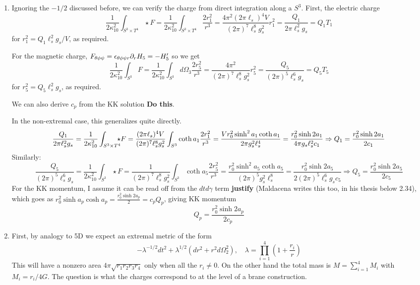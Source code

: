 \documentclass[11pt, class=article, crop=false]{standalone}
\begin{document}
\begin{enumerate}
	Finally, the D1 solution can be given momentum. 
	
	\item 
	Ignoring the $-1/2$ discussed before, we can verify the charge from direct integration along a $S^3$. First, the electric charge 
	\[
		\frac{1}{2 \kappa_{10}^2} \int_{S^3 \times T^4} \star F = \frac{1}{2 \kappa_{10}^2} \int_{S^3 \times T^4} \frac{2 r_1^2}{r^3} = \frac{4\pi^2 (2\pi \ell_s)^4 V}{(2\pi)^7 \ell_s^8 g_s^2} r_1^2 = \frac{Q_1}{2\pi \ell_s^2 g_s} = Q_1 T_1
	\]
	for $r_1^2 = Q_1 \ell_s^2 g_s/V$, as required.
	
	For the magnetic charge, $F_{\theta \phi \psi} = \epsilon_{\theta \phi \psi r} \partial_r H_5 = -H_5'$ so we get
	\[
		\frac{1}{2 \kappa_{10}^2} \int_{S^3} F = \frac{1}{2 \kappa_{10}^2} \int_{S^3} d\Omega_3 \frac{2 r_5^2}{r^3} = \frac{4 \pi^2}{(2\pi)^7 \ell_s^8 g_s^2} r_5^2 = \frac{Q_5}{(2\pi)^5 \ell_s^6 g_s} = Q_5 T_5
	\]
	for $r_5^2= Q_5 \ell_s^2 g_s$, as required.
	
	We can also derive $c_p$ from the KK solution \textbf{Do this}.
	
	In the non-extremal case, this generalizes quite directly. 
	\[
		\frac{Q_1}{2 \pi \ell_s^2 g_s} = \frac{1}{2\kappa_{10}^2} \int_{S^3 \times T^4}  \hspace{-.1in}\star F = \frac{(2 \pi \ell_s)^4 V}{(2\pi)^7 \ell_s^8 g_s^2} \int_{S^3} \coth a_1 \frac{2 r_1^2}{r^3} = \frac{V r_0^2 \sinh^2 a_1 \coth a_1}{2\pi g_s^2 \ell_s^4} = \frac{r_0^2 \sinh 2a_1 }{4\pi g_s \ell_s^2 c_1} \Rightarrow Q_1 = \frac{r_0^2 \sinh 2 a_1}{2 c_1}
	\]
	Similarly: 
	\[
		\frac{Q_5}{(2 \pi)^5 \ell_s^6 g_s} = \frac{1}{2\kappa_{10}^2} \int_{S^3}  \star F = \frac{1}{(2\pi)^7 \ell_s^8 g_s^2} \int_{S^3} \coth a_5 \frac{2 r_5^2}{r^3} = \frac{r_0^2 \sinh^2 a_5 \coth a_5}{(2 \pi)^5 g_s^2 \ell_s^8} = \frac{r_0^2 \sinh 2a_5}{2 (2 \pi)^5 \ell_s^6 g_s c_5} \Rightarrow Q_5 = \frac{r_0^2 \sinh 2 a_5}{2 c_5}
	\]
	For the KK momentum, I assume it can be read off from the $dt d\gamma$ term \textbf{justify} (Maldacena writes this too, in his thesis below 2.34), which goes as $r_0^2 \sinh a_p \cosh a_p = \frac{r_0^2 \sinh 2a_p}{2} = c_p Q_p$, giving KK momentum
	\[
		Q_p = \frac{r_0^2 \sinh 2a_p}{2 c_p}
	\]
	
	\item 
	First, by analogy to 5D we expect an extremal metric of the form
	\[
		- \lambda^{-1/2} dt^2 + \lambda^{1/2} (dr^2 + r^2 d\Omega_2^2), \quad \lambda = \prod_{i=1}^4 (1 + \frac{r_i}{r})
	\]
	This will have a nonzero area $4 \pi \sqrt{r_1 r_2 r_3 r_4}$ only when all the $r_i \neq 0$. On the other hand the total mass is $M = \sum_{i=1}^4 M_i$ with $M_i = r_i/4G$. The question is what the charges correspond to at the level of a brane construction. 
	

\end{enumerate}
\end{document}
